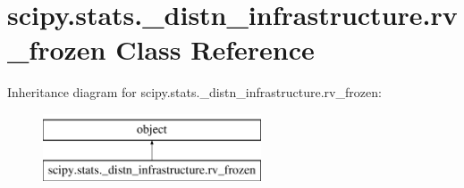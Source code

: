 \hypertarget{classscipy_1_1stats_1_1__distn__infrastructure_1_1rv__frozen}{}\section{scipy.\+stats.\+\_\+distn\+\_\+infrastructure.\+rv\+\_\+frozen Class Reference}
\label{classscipy_1_1stats_1_1__distn__infrastructure_1_1rv__frozen}
Inheritance diagram for scipy.\+stats.\+\_\+distn\+\_\+infrastructure.\+rv\+\_\+frozen\+:\begin{figure}[H]
\begin{center}
\leavevmode
\includegraphics[height=2.000000cm]{classscipy_1_1stats_1_1__distn__infrastructure_1_1rv__frozen}
\end{center}
\end{figure}
